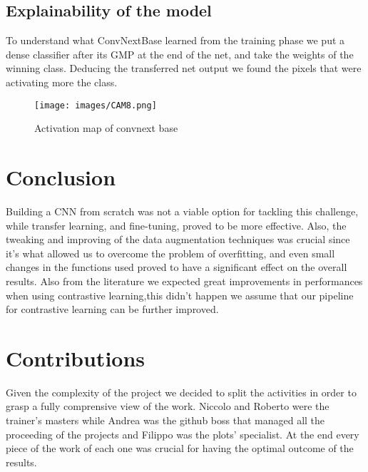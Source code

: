 \documentclass[conference,compsoc,11pt]{IEEEtran}
\begin{document}
\subsection{Explainability of the model}
To understand what ConvNextBase learned from the training phase we put a dense classifier after its GMP at the end of the net, and take the weights of the winning class. Deducing the transferred net output we found the pixels that were activating more the class.

\begin{figure}[h]
    \centering
    \texttt{[image: images/CAM8.png]}
    \caption{Activation map of convnext base}
    \label{fig:heatmap}
\end{figure}


\section{Conclusion}
Building a CNN from scratch was not a viable option for tackling this challenge, while transfer learning, and fine-tuning, proved to be more effective. Also, the tweaking and improving of the data augmentation techniques was crucial since it's what allowed us to overcome the problem of overfitting, and even small changes in the functions used proved to have a significant effect on the overall results. Also from the literature we expected great improvements in performances when using contrastive learning,this didn't happen we assume that our pipeline for contrastive learning can be further improved. 



\section{Contributions}
Given the complexity of the project we decided to split the activities in order to grasp a fully comprensive view of the work. Niccolo and Roberto were the trainer's masters while Andrea was the github boss that managed all the proceeding of the projects and Filippo was the plots' specialist. At the end every piece of the work of each one was crucial for having the optimal outcome of the results.
\end{document}
